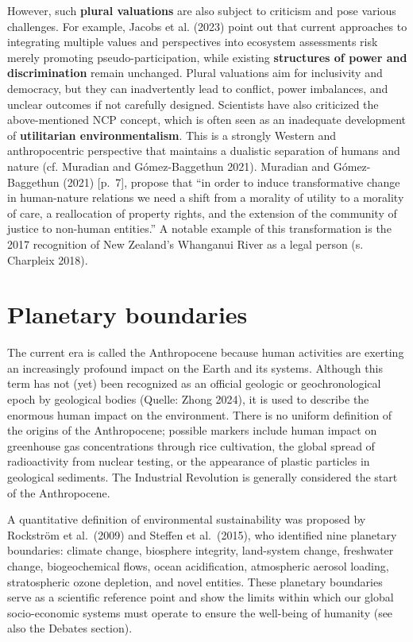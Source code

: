 \documentclass[
  a4paper,
  openany]{book}
\begin{document}
However, such \textbf{plural valuations} are also subject to criticism
and pose various challenges. For example, Jacobs et al. (2023) point out
that current approaches to integrating multiple values and perspectives
into ecosystem assessments risk merely promoting pseudo-participation,
while existing \textbf{structures of power and discrimination} remain
unchanged. Plural valuations aim for inclusivity and democracy, but they
can inadvertently lead to conflict, power imbalances, and unclear
outcomes if not carefully designed. Scientists have also criticized the
above-mentioned NCP concept, which is often seen as an inadequate
development of \textbf{utilitarian environmentalism}. This is a strongly
Western and anthropocentric perspective that maintains a dualistic
separation of humans and nature (cf. Muradian and Gómez-Baggethun 2021).
Muradian and Gómez-Baggethun (2021) {[}p.~7{]}, propose that ``in order
to induce transformative change in human-nature relations we need a
shift from a morality of utility to a morality of care, a reallocation
of property rights, and the extension of the community of justice to
non-human entities.'' A notable example of this transformation is the
2017 recognition of New Zealand's Whanganui River as a legal person (s.
Charpleix 2018).

\section{Planetary boundaries}\label{planetary-boundaries}

The current era is called the Anthropocene because human activities are
exerting an increasingly profound impact on the Earth and its systems.
Although this term has not (yet) been recognized as an official geologic
or geochronological epoch by geological bodies (Quelle: Zhong 2024), it
is used to describe the enormous human impact on the environment. There
is no uniform definition of the origins of the Anthropocene; possible
markers include human impact on greenhouse gas concentrations through
rice cultivation, the global spread of radioactivity from nuclear
testing, or the appearance of plastic particles in geological sediments.
The Industrial Revolution is generally considered the start of the
Anthropocene.

A quantitative definition of environmental sustainability was proposed
by Rockström et al.~(2009) and Steffen et al.~(2015), who identified
nine planetary boundaries: climate change, biosphere integrity,
land-system change, freshwater change, biogeochemical flows, ocean
acidification, atmospheric aerosol loading, stratospheric ozone
depletion, and novel entities. These planetary boundaries serve as a
scientific reference point and show the limits within which our global
socio-economic systems must operate to ensure the well-being of humanity
(see also the Debates section).
\end{document}
